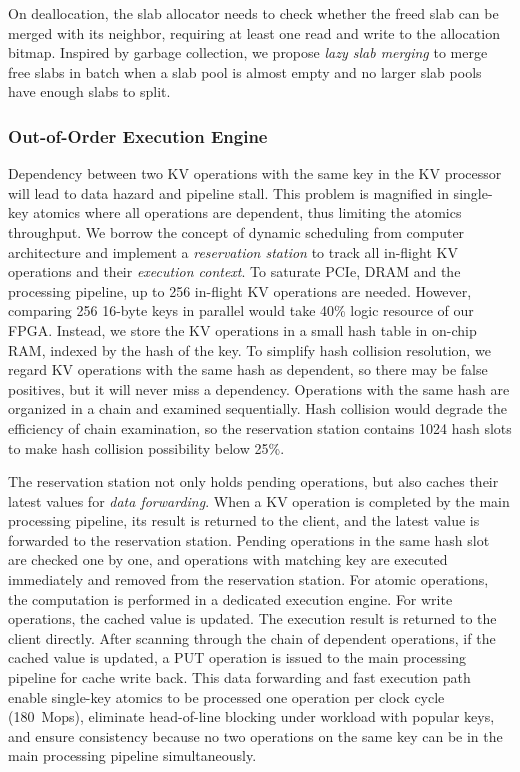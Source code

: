 On deallocation, the slab allocator needs to check whether the freed slab can be merged with its neighbor, requiring at least one read and write to the allocation bitmap.
Inspired by garbage collection, we propose \textit{lazy slab merging} to merge free slabs in batch when a slab pool is almost empty and no larger slab pools have enough slabs to split.

\subsubsection{Out-of-Order Execution Engine}
\label{sec:ooo}
%

Dependency between two KV operations with the same key in the KV processor will lead to data hazard and pipeline stall.
This problem is magnified in single-key atomics where all operations are dependent, thus limiting the atomics throughput.
We borrow the concept of dynamic scheduling from computer architecture and implement a \textit{reservation station} to track all in-flight KV operations and their \textit{execution context}.
To saturate PCIe, DRAM and the processing pipeline, up to 256 in-flight KV operations are needed.
However, comparing 256 16-byte keys in parallel would take 40\% logic resource of our FPGA.
Instead, we store the KV operations in a small hash table in on-chip RAM, indexed by the hash of the key.
To simplify hash collision resolution, we regard KV operations with the same hash as dependent, so there may be false positives, but it will never miss a dependency.
Operations with the same hash are organized in a chain and examined sequentially.
Hash collision would degrade the efficiency of chain examination, so the reservation station contains 1024 hash slots to make hash collision possibility below 25\%.

The reservation station not only holds pending operations, but also caches their latest values for \textit{data forwarding}.
When a KV operation is completed by the main processing pipeline, its result is returned to the client, and the latest value is forwarded to the reservation station.
Pending operations in the same hash slot are checked one by one, and operations with matching key are executed immediately and removed from the reservation station.
For atomic operations, the computation is performed in a dedicated execution engine.
For write operations, the cached value is updated.
The execution result is returned to the client directly.
After scanning through the chain of dependent operations, if the cached value is updated, a PUT operation is issued to the main processing pipeline for cache write back.
This data forwarding and fast execution path enable single-key atomics to be processed one operation per clock cycle (180~Mops), eliminate head-of-line blocking under workload with popular keys, and ensure consistency because no two operations on the same key can be in the main processing pipeline simultaneously.


